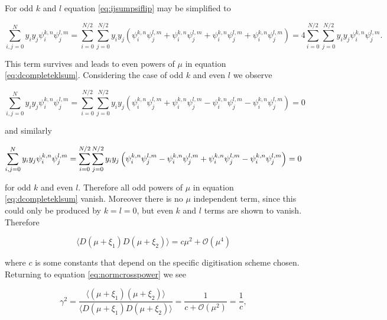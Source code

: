 \documentclass[apj]{emulateapj}
\begin{document}
For odd $k$ and $l$ equation \ref{eq:ijsumpsiflip} may be simplified to

\begin{equation}
\sum_{i,j = 0}^N y_i y_j \psi_i^{k, n} \psi_j^{l, m} = \sum_{i = 0}^{N/2}\sum_{j = 0}^{N/2} y_i y_j \left( \psi_i^{k, n} \psi_j^{l, m} + \psi_{i}^{k, n} \psi_j^{l, m} + \psi_i^{k, n} \psi_{j}^{l, m} + \psi_{i}^{k, n} \psi_{j}^{l, m} \right) = 4 \sum_{i = 0}^{N/2}\sum_{j = 0}^{N/2} y_i y_j \psi_i^{k, n} \psi_j^{l, m}.
\end{equation}

This term survives and leads to even powers of $\mu$ in equation \ref{eq:dcompleteklsum}. Considering the case of odd $k$ and even $l$ we observe

\begin{equation}
\sum_{i,j = 0}^N y_i y_j \psi_i^{k, n} \psi_j^{l, m} = \sum_{i = 0}^{N/2}\sum_{j = 0}^{N/2} y_i y_j \left( \psi_i^{k, n} \psi_j^{l, m} + \psi_{i}^{k, n} \psi_j^{l, m} - \psi_i^{k, n} \psi_{j}^{l, m} - \psi_{i}^{k, n} \psi_{j}^{l, m} \right) = 0
\end{equation}

and similarly

\begin{equation}
\sum_{i,j = 0}^N y_i y_j \psi_i^{k, n} \psi_j^{l, m} = \sum_{i = 0}^{N/2}\sum_{j = 0}^{N/2} y_i y_j \left( \psi_i^{k, n} \psi_j^{l, m} - \psi_{i}^{k, n} \psi_j^{l, m} + \psi_i^{k, n} \psi_{j}^{l, m} - \psi_{i}^{k, n} \psi_{j}^{l, m} \right) = 0\\
\end{equation}

for odd $k$ and even $l$. Therefore all odd powers of $\mu$ in equation \ref{eq:dcompleteklsum} vanish. Moreover there is no $\mu$ independent term, since this could only be produced by $k=l=0$, but even $k$ and $l$ terms are shown to vanish. Therefore

\begin{equation}
\langle D(\mu + \xi_1) D(\mu + \xi_2) \rangle = c \mu^2 + \mathcal{O}(\mu^4)
\end{equation}

where $c$ is some constants that depend on the specific digitisation scheme chosen. Returning to equation \ref{eq:normcrosspower} we see

\begin{equation}
\gamma^2  = \frac{\langle (\mu + \xi_1) (\mu + \xi_2) \rangle}{\langle D(\mu + \xi_1) D(\mu + \xi_2) \rangle} = \frac{1}{c + \mathcal{O}(\mu^2)} = \frac{1}{c},
\end{equation}
\end{document}

